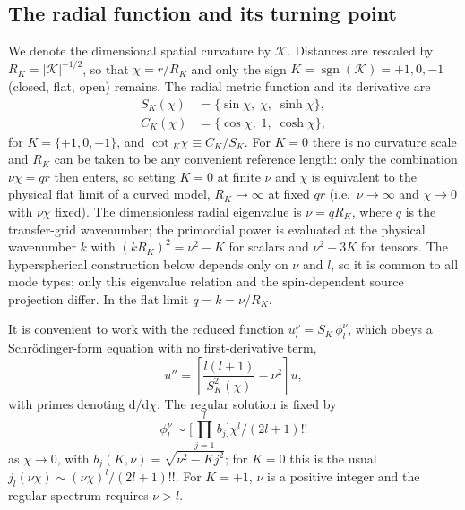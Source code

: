 \documentclass[prd, twocolumn, superscriptaddress, tightenlines, longbibliography, nofootinbib, eqsecnum, amsfonts, amsmath, floatfix, notitlepage]{revtex4-2}
\newcommand{\dd}{\mathrm{d}}
\newcommand{\SK}{S_K}
\newcommand{\CK}{C_K}
\newcommand{\cotK}{\cot{}_K}
\newcommand{\jl}{j_l}
\newcommand{\abs}[1]{\left|#1\right|}
\newcommand{\sgn}{\operatorname{sgn}}
\begin{document}
\subsection{The radial function and its turning point}
\label{sec:bessel-eq}

We denote the dimensional spatial curvature by $\mathcal K$. Distances are
rescaled by $R_K=\abs{\mathcal K}^{-1/2}$, so that $\chi=r/R_K$ and only the sign
$K=\sgn(\mathcal K)=+1,0,-1$ (closed, flat, open) remains. The radial metric
function and its derivative are
\begin{equation}
  \begin{aligned}
  \SK(\chi)&=\{\sin\chi,\;\chi,\;\sinh\chi\},\\
  \CK(\chi)&=\{\cos\chi,\;1,\;\cosh\chi\},
  \end{aligned}
\end{equation}
for $K=\{+1,0,-1\}$, and $\cotK\chi\equiv\CK/\SK$. For $K=0$ there is no
curvature scale and $R_K$ can be taken to be any convenient reference length:
only the combination $\nu\chi=qr$ then enters, so setting $K=0$ at finite $\nu$
and $\chi$ is equivalent to the physical flat limit of a curved model,
$R_K\to\infty$ at fixed $qr$ (i.e.\ $\nu\to\infty$ and $\chi\to0$ with
$\nu\chi$ fixed). The dimensionless radial
eigenvalue is $\nu=qR_K$, where $q$ is the transfer-grid wavenumber; the
primordial power is evaluated at the physical wavenumber $k$ with
$(kR_K)^2=\nu^2-K$ for scalars and $\nu^2-3K$ for tensors. The hyperspherical
construction below depends only on $\nu$ and $l$, so it is common to all mode types;
only this eigenvalue relation and the spin-dependent source projection differ. In the
flat limit $q=k=\nu/R_K$.

It is convenient to work with the reduced function
$u_l^\nu=\SK\,\phi_l^\nu$, which obeys a Schr\"odinger-form equation with no
first-derivative term,
\begin{equation}
  u''=\left[\frac{l(l+1)}{\SK^2(\chi)}-\nu^2\right]u ,
  \label{eq:reduced}
\end{equation}
with primes denoting $\dd/\dd\chi$. The regular solution is fixed by
\begin{equation}
\phi_l^\nu\sim
\big[\textstyle\prod_{j=1}^l b_j\big]\chi^l/(2l+1)!!
\end{equation}
 as $\chi\to0$, with
$b_j(K,\nu)=\sqrt{\nu^2-Kj^2}$; for $K=0$ this is the usual
$\jl(\nu\chi)\sim(\nu\chi)^l/(2l+1)!!$. For $K=+1$, $\nu$ is a positive integer
and the regular spectrum requires $\nu>l$.
\end{document}
